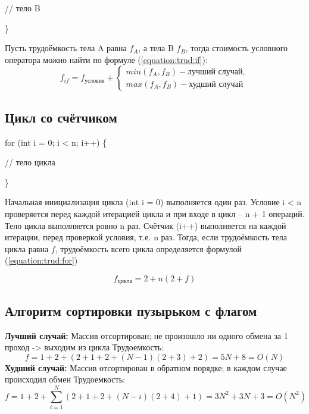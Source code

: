 \documentclass[utf8x, 12pt]{G7-32}
\begin{document}
                // тело B
            
            \}

            Пусть трудоёмкость тела A равна $ f_A $, а тела B $ f_B $, тогда
            стоимость условного оператора можно найти по формуле (\ref{equation:trud:if}):
            \begin{equation}
                f_{if} = f_\text{условия} + \left\{
                    \begin{matrix}
                    min(f_A, f_B) - \text{лучший случай},\\
                    max(f_A, f_B) - \text{худший случай} 
                    \end{matrix}\right.
                \label{equation:trud:if}
            \end{equation}

        \subsection{Цикл со счётчиком}
            for (int i = 0; i < n; i++) \{

                // тело цикла

            \}
            
            Начальная инициализация цикла (int i = 0) выполняется один раз.
            Условие i < n проверяется перед каждой итерацией цикла и при входе в цикл -- n + 1 операций.
            Тело цикла выполняется ровно n раз.
            Счётчик (i++) выполняется на каждой итерации, перед проверкой условия, т.е. n раз.
            Тогда, если трудоёмкость тела цикла равна $ f $, трудоёмкость всего цикла определяется формулой (\ref{equation:trud:for})

            \begin{equation}
                f_\text{цикла} = 2 + n(2 + f)
                \label{equation:trud:for}
            \end{equation}

\newpage
\subsection{Алгоритм сортировки пузырьком с флагом}
 
\textbf{Лучший случай:} Массив отсортирован; не произошло ни одного обмена за 1 проход -> выходим из цикла \newline
Трудоемкость:
            \begin{equation}
                f = 1 + 2 + (2 + 1 + 2 + (N - 1) (2 + 3) + 2) = 5N + 8= O(N)
            \end{equation}
\textbf{Худший случай:}  Массив отсортирован в обратном порядке; в каждом случае происходил обмен\newline
Трудоемкость: 
 	\begin{equation}
                f = 1 + 2 + \sum_{i=1}^N (2 + 1 + 2 + (N - i)(2 + 4) + 1) = 3N^2 + 3N + 3 = O(N^2)
            \end{equation}
\end{document}
